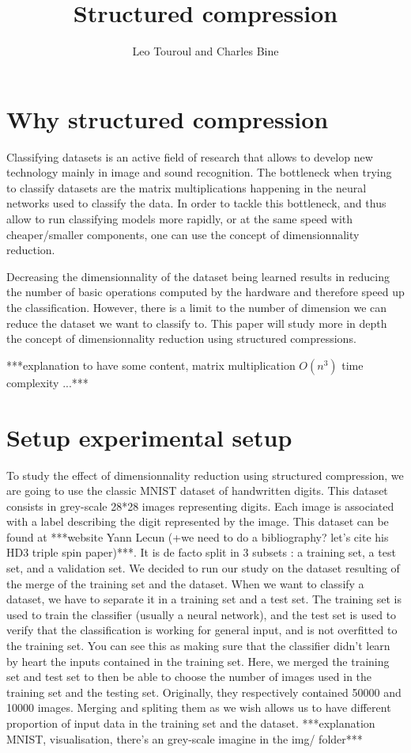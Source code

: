 \documentclass[11pt,a4paper]{article}
\author{Leo Touroul and Charles Bine}
\title{Structured compression}
\begin{document}
	\maketitle

	\section{Why structured compression}
	Classifying datasets is an active field of research that allows to develop new technology mainly in image and sound recognition.
	The bottleneck when trying to classify datasets are the matrix multiplications happening in the neural networks used to classify the data.
	In order to tackle this bottleneck, and thus allow to run classifying models more rapidly, or at the same speed with cheaper/smaller components, one can use the concept of dimensionnality reduction.
	
	Decreasing the dimensionnality of the dataset being learned results in reducing the number of basic operations computed by the hardware and therefore speed up the classification.
	However, there is a limit to the number of dimension we can reduce the dataset we want to classify to. This paper will study more in depth the concept of dimensionnality reduction using structured compressions.
	
	***explanation to have some content, matrix multiplication $O(n^3)$ time complexity ...***		
	
	\section{Setup experimental setup}
	To study the effect of dimensionnality reduction using structured compression, we are going to use the classic MNIST dataset of handwritten digits. This dataset consists in grey-scale 28*28 images representing digits. Each image is associated with a label describing the digit represented by the image.
	This dataset can be found at ***website Yann Lecun (+we need to do a bibliography? let's cite his HD3 triple spin paper)***. It is de facto split in 3 subsets : a training set, a test set, and a validation set. We decided to run our study on the dataset resulting of the merge of the training set and the dataset.
	When we want to classify a dataset, we have to separate it in a training set and a test set. The training set is used to train the classifier (usually a neural network), and the test set is used to verify that the classification is working for general input, and is not overfitted to the training set. You can see this as making sure that the classifier didn't learn by heart the inputs contained in the training set.
	Here, we merged the training set and test set to then be able to choose the number of images used in the training set and the testing set. Originally, they respectively contained 50000 and 10000 images. Merging and spliting them as we wish allows us to have different proportion of input data in the training set and the dataset.
	***explanation MNIST, visualisation, there's an grey-scale imagine in the img/ folder***
	
\end{document}
